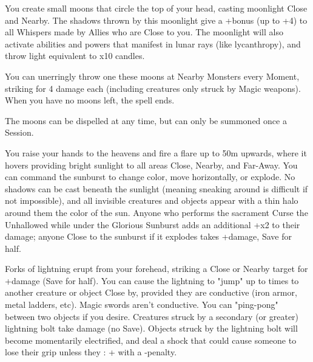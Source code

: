 {\newpage

\MYSTERY [
  Name = Children of Shul,
  Link = arcana-mystery-children-of-shul,
  Paradigm = Prophesy,
  Save = Y (half),
  Duration = Session,
  Target = Self
]

You create \DICE small moons that circle the top of your head, casting moonlight Close and Nearby.  The shadows thrown by this moonlight give a +\DICE bonus (up to +4) to all Whispers made by Allies who are Close to you.  The moonlight will also activate abilities and powers that manifest in lunar rays (like lycanthropy), and throw light equivalent to \DICE x10 candles.

You can unerringly throw one these moons at Nearby Monsters every Moment, striking for 4 damage each (including creatures only struck by Magic weapons).  When you have no moons left, the spell ends.

The moons can be dispelled at any time, but can only be summoned once a Session.

\MYSTERY [
  Name = Glorious Sunburst,
  Link = arcana-mystery-glorious-sunburst,
  Paradigm = Elements,
  Save = Y (half),
  Duration = Combat or \SUM Minutes,
  Target = See Below
]

You raise your hands to the heavens and fire a flare up to 50m upwards, where it hovers providing bright sunlight to all areas Close, Nearby, and Far-Away.  You can command the sunburst to change color, move horizontally, or explode.  No shadows can be cast beneath the sunlight (meaning sneaking around is difficult if not impossible), and all invisible creatures and objects appear with a thin halo around them the color of the sun.  Anyone who performs the sacrament Curse the Unhallowed while under the Glorious Sunburst adds an additional +\DICE x2 to their damage; anyone Close to the sunburst if it explodes takes \SUMDICE+\DICE damage, Save for half.

\MYSTERY [
  Name = Lightning,
  Link = arcana-mystery-lightning,
  Paradigm = Elements,
  Save = Y (half),
  Duration = Instant,
  Target = Close or Nearby Target(s)
]

Forks of lightning erupt from your forehead, striking a Close or Nearby target for \SUMDICE+\DICE damage (Save for half). You can cause the lightning to "jump" up to  times to another creature or object Close by, provided they are conductive (iron armor, metal ladders, etc).  Magic swords aren't conductive.  You can "ping-pong" between two objects if you desire. Creatures struck by a secondary (or greater) lightning bolt take \DICE damage (no Save). Objects struck by the lightning bolt will become momentarily electrified, and deal a shock that could cause someone to lose their grip unless they \RO : \VIG + \FOC with a -\DICE penalty.

}
